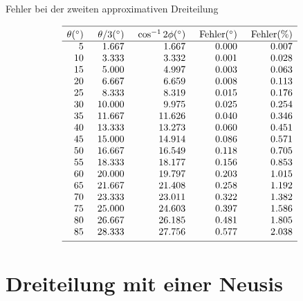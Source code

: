 \begin{table}[t]
\caption{Fehler bei der zweiten approximativen Dreiteilung}\label{t.trisect-second-approx}
\[
%
\begin{array}{r@{\hspace{5mm}}r@{\hspace{5mm}}r@{\hspace{5mm}}r@{\hspace{5mm}}r}
\hline
\noalign{\smallskip}
\theta ({}^\circ) & \theta/3 ({}^\circ)& \cos^{-1} 2\phi ({}^\circ) & \mathrm{Fehler} ({}^\circ) & \mathrm{Fehler (\%)}\\
\hline
  5 &    1.667 &    1.667  &     0.000 &    0.007 \\
 10 &    3.333 &    3.332  &     0.001 &    0.028 \\
 15 &    5.000 &    4.997  &     0.003 &    0.063 \\
 20 &    6.667 &    6.659  &     0.008 &    0.113 \\
 25 &    8.333 &    8.319  &     0.015 &    0.176 \\
 30 &   10.000 &    9.975  &     0.025 &    0.254 \\
 35 &   11.667 &   11.626  &     0.040 &    0.346 \\
 40 &   13.333 &   13.273  &     0.060 &    0.451 \\
 45 &   15.000 &   14.914  &     0.086 &    0.571 \\
 50 &   16.667 &   16.549  &     0.118 &    0.705 \\
 55 &   18.333 &   18.177  &     0.156 &    0.853 \\
 60 &   20.000 &   19.797  &     0.203 &    1.015 \\
 65 &   21.667 &   21.408  &     0.258 &    1.192 \\
 70 &   23.333 &   23.011  &     0.322 &    1.382 \\
 75 &   25.000 &   24.603  &     0.397 &    1.586 \\
 80 &   26.667 &   26.185  &     0.481 &    1.805 \\
 85 &   28.333 &   27.756  &     0.577 &    2.038 \\
 \noalign{\smallskip}
 \hline
 \end{array}
\]
\end{table}


\section{Dreiteilung mit einer Neusis}\label{s.neusis}

